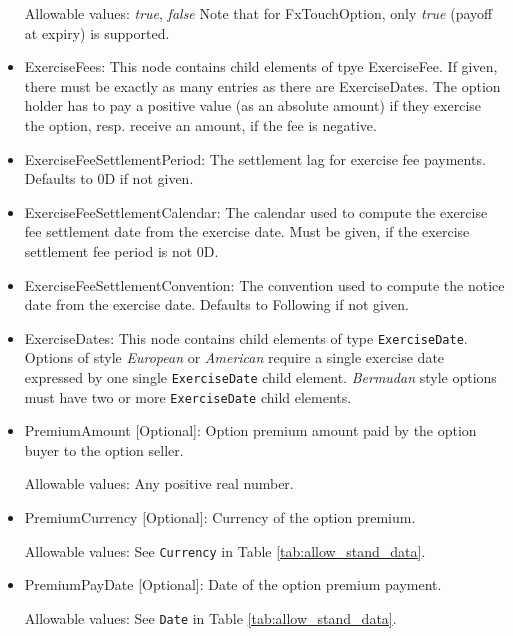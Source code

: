 \begin{itemize}
Allowable values: \emph{true}, \emph{false} Note that for FxTouchOption, only \emph{true} (payoff at expiry) is supported.

\item ExerciseFees: This node contains child elements of tpye ExerciseFee. If given, there must be exactly as many
  entries as there are ExerciseDates. The option holder has to pay a positive value (as an absolute amount) if they
  exercise the option, resp. receive an amount, if the fee is negative.

\item ExerciseFeeSettlementPeriod: The settlement lag for exercise fee payments. Defaults to 0D if not given.

\item ExerciseFeeSettlementCalendar: The calendar used to compute the exercise fee settlement date from the exercise
  date. Must be given, if the exercise settlement fee period is not 0D.

\item ExerciseFeeSettlementConvention: The convention used to compute the notice date from the exercise date. Defaults
  to Following if not given.

\item ExerciseDates: This node contains child elements of type
  \lstinline!ExerciseDate!.  Options of style \emph{European} or
  \emph{American} require a single exercise date expressed by one
  single \lstinline!ExerciseDate! child element.  \emph{Bermudan}
  style options must have two or more \lstinline!ExerciseDate! child
  elements.

\item PremiumAmount [Optional]: Option premium amount paid by the option buyer to the option seller.

Allowable values:  Any positive real number.

\item PremiumCurrency [Optional]: Currency of the option premium.

Allowable values:  See \lstinline!Currency! in Table \ref{tab:allow_stand_data}.

\item PremiumPayDate [Optional]: Date of the option premium payment.

Allowable values:  See \lstinline!Date! in Table \ref{tab:allow_stand_data}.

\end{itemize}

